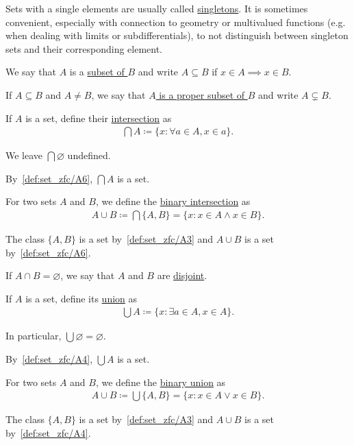 \begin{note}\label{note:singleton_sets}
  Sets with a single elements are usually called \ul{singletons}. It is sometimes convenient, especially with connection to geometry or multivalued functions (e.g. when dealing with limits or subdifferentials), to not distinguish between singleton sets and their corresponding element.
\end{note}

\begin{definition}\label{def:subset}
  We say that $A$ is a \ul{subset of $B$} and write $A \subseteq B$ if $x \in A \implies x \in B$.

  If $A \subseteq B$ and $A \neq B$, we say that \ul{$A$ is a proper subset of $B$} and write $A \subsetneq B$.
\end{definition}

\begin{definition}\label{def:set_intersection}\cite[24]{Enderton1977}
  If $A$ is a set, define their \ul{intersection} as
  \begin{align*}
    \bigcap A \coloneqq \{ x \colon \forall a \in A, x \in a \}.
  \end{align*}

  We leave $\bigcap \varnothing$ undefined.

  By~\ref{def:set_zfc/A6}, $\bigcap A$ is a set.

  For two sets $A$ and $B$, we define the \ul{binary intersection} as
  \begin{align*}
    A \cup B \coloneqq \bigcap \{ A, B \} = \{ x \colon x \in A \land x \in B \}.
  \end{align*}

  The class $\{ A, B \}$ is a set by~\ref{def:set_zfc/A3} and $A \cup B$ is a set by~\ref{def:set_zfc/A6}.

  If $A \cap B = \varnothing$, we say that $A$ and $B$ are \ul{disjoint}.
\end{definition}

\begin{definition}\label{def:set_union}\cite[24]{Enderton1977}
  If $A$ is a set, define its \ul{union} as
  \begin{align*}
    \bigcup A \coloneqq \{ x \colon \exists a \in A, x \in A \}.
  \end{align*}

  In particular, $\bigcup \varnothing = \varnothing$.

  By~\ref{def:set_zfc/A4}, $\bigcup A$ is a set.

  For two sets $A$ and $B$, we define the \ul{binary union} as
  \begin{align*}
    A \cup B \coloneqq \bigcup \{ A, B \} = \{ x \colon x \in A \lor x \in B \}.
  \end{align*}

  The class $\{ A, B \}$ is a set by~\ref{def:set_zfc/A3} and $A \cup B$ is a set by~\ref{def:set_zfc/A4}.
\end{definition}

